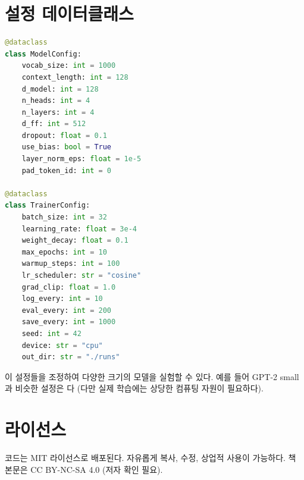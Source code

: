 \section{설정 데이터클래스}

\begin{lstlisting}[language=Python]
@dataclass
class ModelConfig:
    vocab_size: int = 1000
    context_length: int = 128
    d_model: int = 128
    n_heads: int = 4
    n_layers: int = 4
    d_ff: int = 512
    dropout: float = 0.1
    use_bias: bool = True
    layer_norm_eps: float = 1e-5
    pad_token_id: int = 0

@dataclass
class TrainerConfig:
    batch_size: int = 32
    learning_rate: float = 3e-4
    weight_decay: float = 0.1
    max_epochs: int = 10
    warmup_steps: int = 100
    lr_scheduler: str = "cosine"
    grad_clip: float = 1.0
    log_every: int = 10
    eval_every: int = 200
    save_every: int = 1000
    seed: int = 42
    device: str = "cpu"
    out_dir: str = "./runs"
\end{lstlisting}

이 설정들을 조정하여 다양한 크기의 모델을 실험할 수 있다. 예를 들어 GPT-2 small과 비슷한 설정은 다 (다만 실제 학습에는 상당한 컴퓨팅 자원이 필요하다).

\section{라이선스}

코드는 MIT 라이선스로 배포된다. 자유롭게 복사, 수정, 상업적 사용이 가능하다. 책 본문은 CC BY-NC-SA 4.0 (저자 확인 필요).
